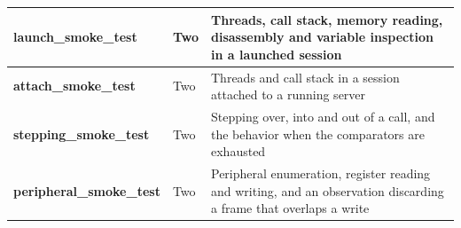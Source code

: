 \begin{table}[H]
\begin{tabularx}{\linewidth}{| @{}>{\hsize\bfseries\ttfamily\scriptsize}Y | >{\hsize}Y | >{\hsize}Y@{} |}
        \hline
        launch\_smoke\_test & \rmfamily Two & Threads, call stack, memory reading, disassembly and variable inspection in a launched session \\
        \hline
        attach\_smoke\_test & \rmfamily Two & Threads and call stack in a session attached to a running server \\
        \hline
        stepping\_smoke\_test & \rmfamily Two & Stepping over, into and out of a call, and the behavior when the comparators are exhausted \\
        \hline
        peripheral\_smoke\_test & \rmfamily Two & Peripheral enumeration, register reading and writing, and an observation discarding a frame that overlaps a write \\
        \hline
    \end{tabularx}
\end{table}
